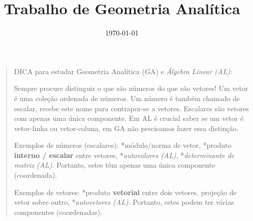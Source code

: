 \documentclass[12pt,a4paper]{article}
\title{Trabalho de Geometria Analítica}
\author{\today}
\date{}
\newenvironment{ans}{\color{blue}\begin{quote}}{\end{quote}}
\begin{document}
\maketitle






\begin{ans}
DICA para estudar Geometria Analítica (GA) e \emph{Álgebra Linear (AL)}:

Sempre procure distinguir o que são números do que são vetores! Um vetor é uma coleção ordenada de números. Um número é também chamado de escalar, recebe este nome para contrapor-se a vetores. Escalares são vetores com apenas uma única componente. Em AL é crucial saber se um vetor é vetor-linha ou vetor-coluna, em GA não precisamos fazer essa distinção.

Exemplos de números (escalares): *módulo/norma de vetor, *produto {\bf interno / escalar} entre vetores, *\emph{autovalores (AL)}, *\emph{determinante de matriz (AL)}. Portanto, estes têm apenas uma única componente (coordenada).

Exemplos de vetores: *produto {\bf vetorial} entre dois vetores, projeção de vetor sobre outro, *\emph{autovetores (AL)}. Portanto, estes podem ter várias componentes (coordenadas).

\end{ans}
\end{document}
